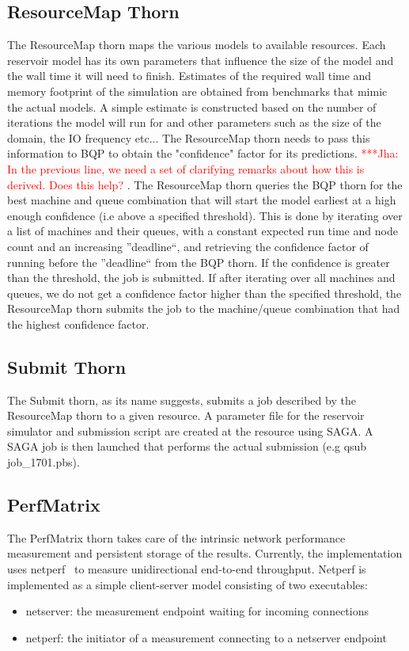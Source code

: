 \documentclass[conference,final]{IEEEtran}
\newcommand{\jhanote}[1]{ {\textcolor{red} { ***Jha: #1 }}}
\begin{document}
\subsection{ResourceMap Thorn}
The ResourceMap thorn maps the various models to available resources.
Each reservoir model has its own parameters that influence the size of
the model and the wall time it will need to finish. Estimates of the required
wall time and memory footprint of the simulation are obtained from
benchmarks that mimic the actual models. A simple estimate
is constructed based on the number of iterations the model will run for
and other parameters such as the size of the domain, the IO frequency etc...
The ResourceMap thorn needs to pass this information to BQP to obtain the 
"confidence" factor for its predictions.
 \jhanote{In the
  previous line, we need a set of clarifying remarks about how this is
  derived. Does this help?}.
The ResourceMap thorn queries the BQP
thorn for the best machine and queue combination that will start the
model earliest at a high enough confidence (i.e above a specified
threshold). This is done by iterating over a list of machines and
their queues, with a constant expected run time and node count and an
increasing ''deadline``, and retrieving the confidence factor of
running before the ''deadline`` from the BQP thorn. If the confidence
is greater than the threshold, the job is submitted. If after
iterating over all machines and queues, we do not get a confidence
factor higher than the specified threshold, the ResourceMap thorn
submits the job to the machine/queue combination that had the highest
confidence factor.

\subsection{Submit Thorn} 
The Submit thorn, as its name suggests, submits a job described by the
ResourceMap thorn to a given resource. A parameter file for the
reservoir simulator and submission script are created at the resource
using SAGA. A SAGA job is then launched that performs the actual
submission (e.g qsub job\_1701.pbs).

\subsection{PerfMatrix} The PerfMatrix thorn takes care of the
intrinsic network performance measurement and persistent storage of
the results. Currently, the implementation uses
netperf~\cite{netperf_web} to measure unidirectional end-to-end
throughput. Netperf is implemented as a simple client-server model
consisting of two executables:
\begin{itemize}
\item{netserver: the measurement endpoint waiting for incoming connections}
\item{netperf: the initiator of a measurement connecting to a netserver endpoint}
\end{itemize}
\end{document}
